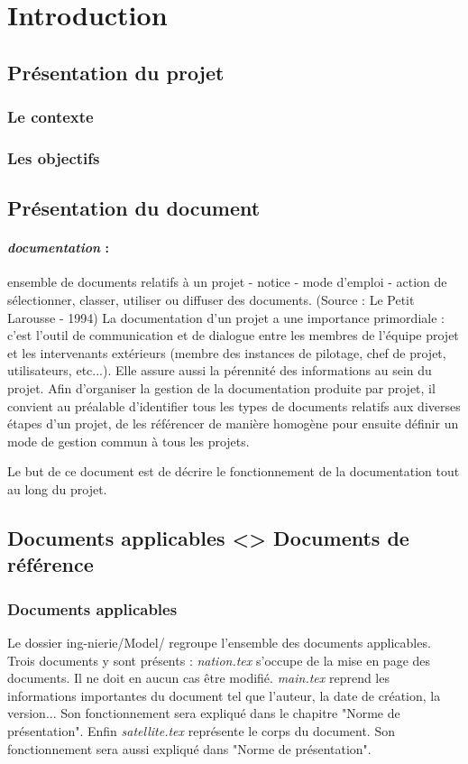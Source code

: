 \section{Introduction}     
  \subsection{Présentation du projet}
    
    \subsubsection{Le contexte}     
     
    \subsubsection{Les objectifs}    
     
  \subsection{Présentation du document}
  
    \paragraph*{\textit{documentation} :}ensemble de documents relatifs à un projet - notice - mode d’emploi - action de sélectionner, classer, utiliser ou diffuser des documents. (Source : Le Petit Larousse - 1994)
    La documentation d’un projet a une importance primordiale : c’est l’outil de communication et de dialogue entre les membres de l’équipe projet et les intervenants extérieurs (membre des instances de pilotage, chef de projet, utilisateurs, etc...). Elle assure aussi la pérennité des informations au sein du projet.
    Afin d’organiser la gestion de la documentation produite par projet, il convient au préalable d’identifier tous les types de documents relatifs aux diverses étapes d’un projet, de les référencer de manière homogène pour ensuite définir un mode de gestion commun à tous les projets.
    \par Le but de ce document est de décrire le fonctionnement de la documentation tout au long du projet.
  
  \subsection{Documents applicables <> Documents de référence}
    \subsubsection{Documents applicables}
      Le dossier ing-nierie/Model/ regroupe l'ensemble des documents applicables. Trois documents y sont présents : \textit{nation.tex} s'occupe de la mise
      en page des documents. Il ne doit en aucun cas être modifié. \textit{main.tex} reprend les informations importantes du document tel que l'auteur,
      la date de création, la version... Son fonctionnement sera expliqué dans le chapitre "Norme de présentation". Enfin \textit{satellite.tex} représente
      le corps du document. Son fonctionnement sera aussi expliqué dans "Norme de présentation".
